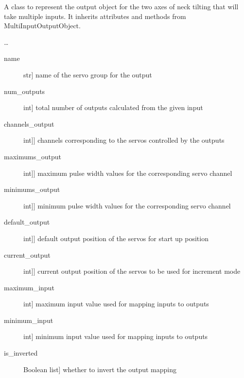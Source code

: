 \documentclass[letterpaper,10pt,english]{sphinxmanual}
\begin{document}
\begin{fulllineitems}
\label{\detokenize{specific:NeckTiltOutput.NeckTiltOutput}}
\sphinxAtStartPar
A class to represent the output object for the two axes of neck tilting that will take multiple inputs.
It inherits attributes and methods from MultiInputOutputObject.

\sphinxAtStartPar
…
\begin{description}
\item[{name}] \leavevmode{[}str{]}
\sphinxAtStartPar
name of the servo group for the output

\item[{num\_outputs}] \leavevmode{[}int{]}
\sphinxAtStartPar
total number of outputs calculated from the given input

\item[{channels\_output}] \leavevmode{[}{[}int{]}{]}
\sphinxAtStartPar
channels corresponding to the servos controlled by the outputs

\item[{maximums\_output}] \leavevmode{[}{[}int{]}{]}
\sphinxAtStartPar
maximum pulse width values for the corresponding servo channel

\item[{minimums\_output}] \leavevmode{[}{[}int{]}{]}
\sphinxAtStartPar
minimum pulse width values for the corresponding servo channel

\item[{default\_output}] \leavevmode{[}{[}int{]}{]}
\sphinxAtStartPar
default output position of the servos for start up position

\item[{current\_output}] \leavevmode{[}{[}int{]}{]}
\sphinxAtStartPar
current output position of the servos to be used for increment mode

\item[{maximum\_input}] \leavevmode{[}int{]}
\sphinxAtStartPar
maximum input value used for mapping inputs to outputs

\item[{minimum\_input}] \leavevmode{[}int{]}
\sphinxAtStartPar
minimum input value used for mapping inputs to outputs

\item[{is\_inverted}] \leavevmode{[}Boolean list{]}
\sphinxAtStartPar
whether to invert the output mapping


\end{description}
\end{fulllineitems}
\end{document}
